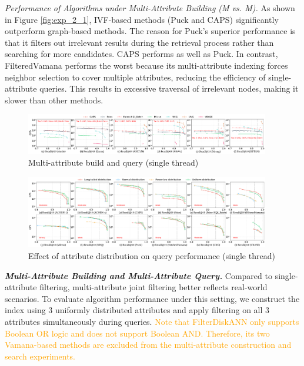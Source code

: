 \documentclass[sigconf, nonacm]{acmart}
\begin{document}
	
	
	\textit{Performance of Algorithms under Multi-Attribute Building (M vs. M).}  
	As shown in Figure \ref{fig:exp_2_1}, IVF-based methods (Puck and CAPS) significantly outperform graph-based methods. The reason for Puck's superior performance is that it filters out irrelevant results during the retrieval process rather than searching for more candidates. CAPS performs as well as Puck. In contrast, FilteredVamana performs the worst because its multi-attribute indexing forces neighbor selection to cover multiple attributes, reducing the efficiency of single-attribute queries. This results in excessive traversal of irrelevant nodes, making it slower than other methods.
	
	
	\begin{figure}
		\centering
		
		\includegraphics[width=0.95\textwidth]{figures/exp/exp_4_1_MultiLabel_1thread.pdf}
		\caption{Multi-attribute build and query (single thread)}
		\label{fig:exp_4_1_MultiLabel_1thread}
	\end{figure}
	
	\begin{figure}
		\centering
		
		\includegraphics[width=0.95\textwidth]{figures/exp/exp_3_1.pdf}
		\caption{Effect of attribute distribution on query performance (single thread)}
		\label{fig:exp_3_1}
	\end{figure}
	
	
	
	
	
	\textit{\textbf{Multi-Attribute Building and Multi-Attribute Query.}}  
	Compared to single-attribute filtering, multi-attribute joint filtering better reflects real-world scenarios. To evaluate algorithm performance under this setting, we construct the index using 3 uniformly distributed attributes and apply filtering on all 3 attributes simultaneously during queries. \textcolor{orange}{Note that FilterDiskANN only supports Boolean OR logic and does not support Boolean AND. Therefore, its two Vamana-based methods are excluded from the multi-attribute construction and search experiments.}
	
\end{document}
